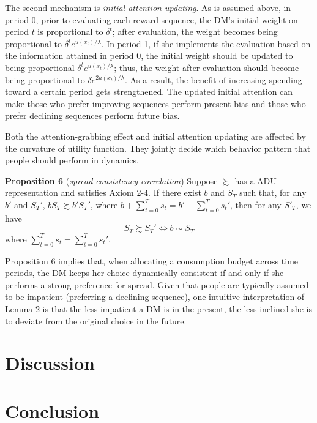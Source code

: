 \documentclass[
  12pt,
]{article}
\begin{document}
The second mechanism is \emph{initial attention updating}. As is assumed
above, in period 0, prior to evaluating each reward sequence, the DM's
initial weight on period \(t\) is proportional to \(\delta^t\); after
evaluation, the weight becomes being proportional to
\(\delta^t e^{u(x_t)/\lambda}\). In period 1, if she implements the
evaluation based on the information attained in period 0, the initial
weight should be updated to being proportional
\(\delta^t e^{u(x_t)/\lambda}\); thus, the weight after evaluation
should become being proportional to \(\delta e^{2u(x_t)/\lambda}\). As a
result, the benefit of increasing spending toward a certain period gets
strengthened. The updated initial attention can make those who prefer
improving sequences perform present bias and those who prefer declining
sequences perform future bias.

Both the attention-grabbing effect and initial attention updating are
affected by the curvature of utility function. They jointly decide which
behavior pattern that people should perform in dynamics.

\textbf{Proposition 6} (\emph{spread-consistency correlation}) Suppose
\(\succsim\) has a ADU representation and satisfies Axiom 2-4. If there
exist \(b\) and \(S_T\) such that, for any \(b'\) and \(S_T'\),
\(bS_T\succsim b'S_T'\), where
\(b+\sum_{t=0}^Ts_t=b'+\sum_{t=0}^Ts_t'\), then for any \(S'_T\), we
have \[S_T \succsim S_T' \Longleftrightarrow b\sim S_T\]where
\(\sum_{t=0}^Ts_t=\sum_{t=0}^Ts_t'\).

Proposition 6 implies that, when allocating a consumption budget across
time periods, the DM keeps her choice dynamically consistent if and only
if she performs a strong preference for spread. Given that people are
typically assumed to be impatient (preferring a declining sequence), one
intuitive interpretation of Lemma 2 is that the less impatient a DM is
in the present, the less inclined she is to deviate from the original
choice in the future.

\hypertarget{discussion}{%
\section{Discussion}\label{discussion}}

\hypertarget{conclusion}{%
\section{Conclusion}\label{conclusion}}

\renewcommand\refname{Reference}
  
\end{document}
